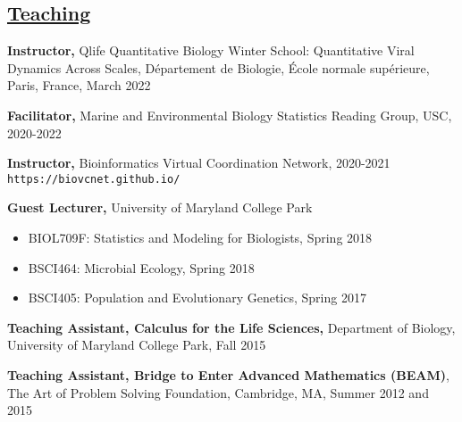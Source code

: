 \documentclass[]{res}
\begin{document}
\begin{resume}
\section{\underline{Teaching}} \vspace{2mm}

{\bf Instructor,} Qlife Quantitative Biology Winter School: Quantitative Viral Dynamics Across Scales, D\'{e}partement de Biologie, \'{E}cole normale sup\'{e}rieure, Paris, France, March 2022

{\bf Facilitator,} {Marine and Environmental Biology Statistics Reading Group}, USC, 2020-2022

{\bf Instructor,} Bioinformatics Virtual Coordination Network, 2020-2021\\
\verb|https://biovcnet.github.io/|

{\bf Guest Lecturer,} University of Maryland College Park
\begin{itemize} \itemsep -2pt
\item BIOL709F: Statistics and Modeling for Biologists, Spring 2018
\item BSCI464: Microbial Ecology, Spring 2018 
\item BSCI405: Population and Evolutionary Genetics, Spring 2017
\end{itemize}

{\bf Teaching Assistant, Calculus for the Life Sciences,} Department of Biology, University of Maryland College Park, Fall 2015%

{\bf Teaching Assistant, Bridge to Enter Advanced Mathematics (BEAM)}, The Art of Problem Solving Foundation, Cambridge, MA, Summer 2012 and 2015 %


\end{resume}
\end{document}

